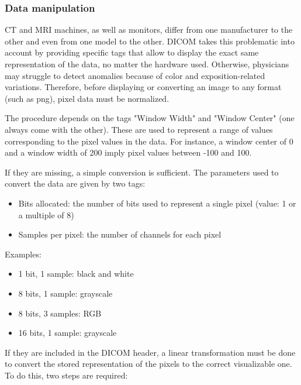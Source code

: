 \subsubsection{Data manipulation}
\label{sec:dicom_data_manipulation}
CT and MRI machines, as well as monitors, differ from one manufacturer to the other and even from one model to the other. DICOM takes this problematic into account by providing specific tags that allow to display the exact same representation of the data, no matter the hardware used. Otherwise, physicians may struggle to detect anomalies because of color and exposition-related variations. 
Therefore, before displaying or converting an image to any format (such as png), pixel data must be normalized. 

The procedure depends on the tags "Window Width" and "Window Center" (one always come with the other). These are used to represent a range of values corresponding to the pixel values in the data. For instance, a window center of 0 and a window width of 200 imply pixel values between -100 and 100. 

If they are missing, a simple conversion is sufficient. The parameters used to convert the data are given by two tags: 
\begin{itemize}
	\item Bits allocated: the number of bits used to represent a single pixel (value: 1 or a multiple of 8)
	\item Samples per pixel: the number of channels for each pixel

\end{itemize}

\noindent Examples: 
\begin{itemize}
\item 1 bit, 1 sample: black and white
\item 8 bits, 1 sample: grayscale
\item 8 bits, 3 samples: RGB
\item 16 bits, 1 sample: grayscale

\end{itemize} 

\noindent If they are included in the DICOM header, a linear transformation must be done to convert the stored representation of the pixels to the correct visualizable one. To do this, two steps are required: 

